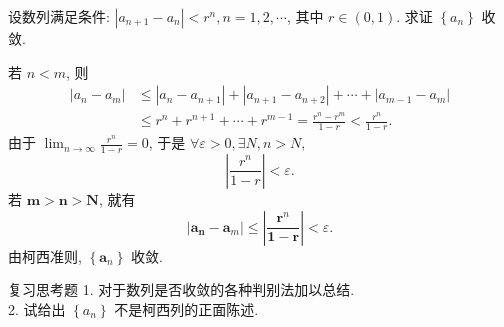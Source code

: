 \documentclass[t,12pt,mathserif] {beamer}
\begin{document}
\begin{frame}{}%
\begin{ex}
 设数列满足条件: $\left|a_{n+1}-a_n\right|<r^n, n=1,2, \cdots$, 其中 $r \in(0,1)$. 求证 $\left\{a_n\right\}$ 收敛.
\end{ex}
\zheng 若 $n<m$, 则
$$
\begin{aligned}
\left|a_n-a_m\right| & \leq\left|a_n-a_{n+1}\right|+\left|a_{n+1}-a_{n+2}\right|+\cdots+\left|a_{m-1}-a_m\right| \\
& \leq r^n+r^{n+1}+\cdots+r^{m-1}=\frac{r^n-r^m}{1-r}<\frac{r^n}{1-r} .
\end{aligned}
$$
由于 $\lim _{n \rightarrow \infty} \frac{r^n}{1-r}=0$, 于是 $\forall \varepsilon>0, \exists N, n>N$,
$$
\left|\frac{r^n}{1-r}\right|<\varepsilon.
$$   
若 $\boldsymbol{m}>\boldsymbol{n}>\boldsymbol{N}$, 就有
$$
\left|\boldsymbol{a}_{\boldsymbol{n}}-\boldsymbol{a}_m\right| \leq\left|\frac{\boldsymbol{r}^n}{\mathbf{1 - r}}\right|<\varepsilon .
$$
由柯西准则, $\left\{\boldsymbol{a}_n\right\}$ 收敛.
\end{frame}
\begin{frame}{}%

\end{frame}

\begin{frame}{  复习思考题}%
1. 对于数列是否收敛的各种判别法加以总结.\\
2. 试给出 $\left\{a_n\right\}$ 不是柯西列的正面陈述.    
\end{frame}
\end{document}
